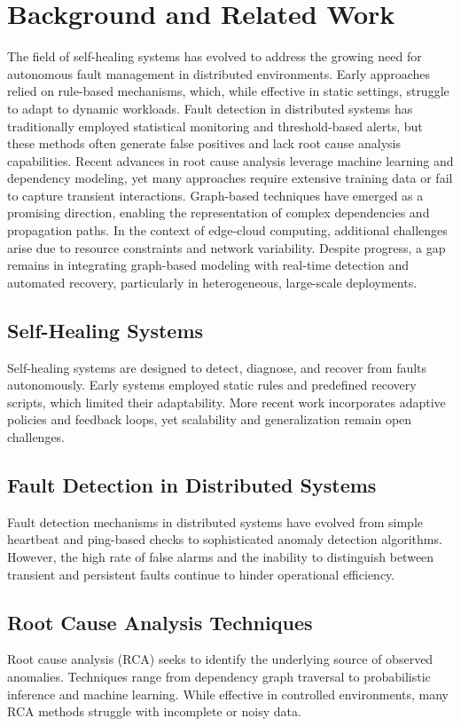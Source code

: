 \documentclass[11pt,twocolumn]{article}
\begin{document}
\section{Background and Related Work}
The field of self-healing systems has evolved to address the growing need for autonomous fault management in distributed environments. Early approaches relied on rule-based mechanisms, which, while effective in static settings, struggle to adapt to dynamic workloads. Fault detection in distributed systems has traditionally employed statistical monitoring and threshold-based alerts, but these methods often generate false positives and lack root cause analysis capabilities. Recent advances in root cause analysis leverage machine learning and dependency modeling, yet many approaches require extensive training data or fail to capture transient interactions. Graph-based techniques have emerged as a promising direction, enabling the representation of complex dependencies and propagation paths. In the context of edge-cloud computing, additional challenges arise due to resource constraints and network variability. Despite progress, a gap remains in integrating graph-based modeling with real-time detection and automated recovery, particularly in heterogeneous, large-scale deployments.

\subsection{Self-Healing Systems}
Self-healing systems are designed to detect, diagnose, and recover from faults autonomously. Early systems employed static rules and predefined recovery scripts, which limited their adaptability. More recent work incorporates adaptive policies and feedback loops, yet scalability and generalization remain open challenges.

\subsection{Fault Detection in Distributed Systems}
Fault detection mechanisms in distributed systems have evolved from simple heartbeat and ping-based checks to sophisticated anomaly detection algorithms. However, the high rate of false alarms and the inability to distinguish between transient and persistent faults continue to hinder operational efficiency.

\subsection{Root Cause Analysis Techniques}
Root cause analysis (RCA) seeks to identify the underlying source of observed anomalies. Techniques range from dependency graph traversal to probabilistic inference and machine learning. While effective in controlled environments, many RCA methods struggle with incomplete or noisy data.
\end{document}
